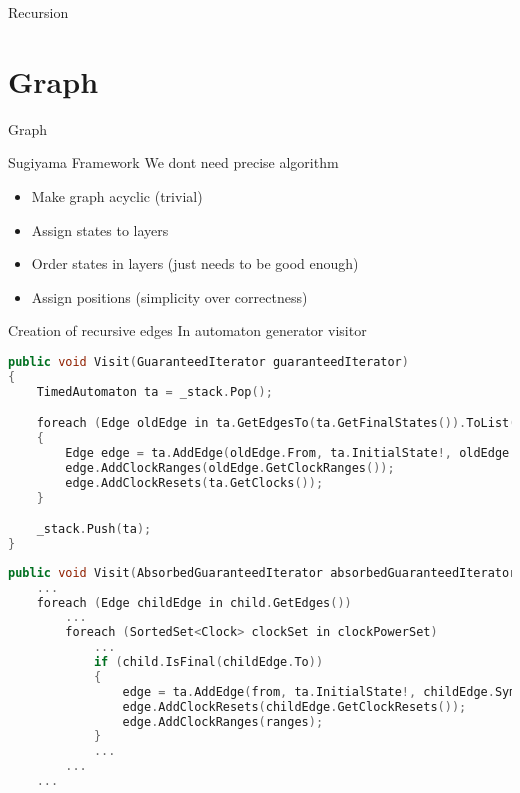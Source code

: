 \begin{frame}{Recursion}
    
    
\end{frame}

\section{Graph}
\begin{frame}[shrink=5]{Graph}
    \begin{center}
        
    \end{center}
\end{frame}
\begin{frame}{Sugiyama Framework}
    We dont need precise algorithm
    \begin{itemize}
        \item Make graph acyclic (trivial)
        \item Assign states to layers
        \item Order states in layers (just needs to be good enough)
        \item Assign positions (simplicity over correctness)
    \end{itemize}
\end{frame}

\begin{frame}[fragile]{Creation of recursive edges}
    In automaton generator visitor
    \begin{lstlisting}[language=c++,basicstyle=\tiny]
public void Visit(GuaranteedIterator guaranteedIterator)
{
    TimedAutomaton ta = _stack.Pop();

    foreach (Edge oldEdge in ta.GetEdgesTo(ta.GetFinalStates()).ToList())
    {
        Edge edge = ta.AddEdge(oldEdge.From, ta.InitialState!, oldEdge.Symbol, true);
        edge.AddClockRanges(oldEdge.GetClockRanges());
        edge.AddClockResets(ta.GetClocks());
    }

    _stack.Push(ta);
}
    \end{lstlisting}
    \begin{lstlisting}[language=c++,basicstyle=\tiny]
public void Visit(AbsorbedGuaranteedIterator absorbedGuaranteedIterator)
    ...
    foreach (Edge childEdge in child.GetEdges())
        ...
        foreach (SortedSet<Clock> clockSet in clockPowerSet)
            ...    
            if (child.IsFinal(childEdge.To))
            {
                edge = ta.AddEdge(from, ta.InitialState!, childEdge.Symbol, true);
                edge.AddClockResets(childEdge.GetClockResets());
                edge.AddClockRanges(ranges);
            }
            ...
        ...
    ...
    \end{lstlisting}
\end{frame}

